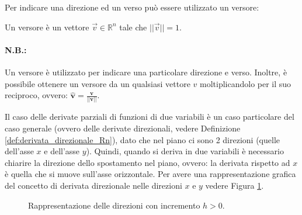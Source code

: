 Per indicare una direzione ed un verso può essere utilizzato un versore:
\begin{definition}[Versore]\label{def:versore}
    Un versore è un vettore $\overset{\rightarrow}{v}\in\mathbb R^n$ tale che $||\overset{\rightarrow}{v}||=1$.
\end{definition}

\paragraph{N.B.:} Un versore è utilizzato per indicare una particolare direzione e verso. Inoltre, è possibile ottenere un versore da un qualsiasi vettore $v$ moltiplicandolo per il suo reciproco, ovvero: $\hat {\mathbf{v}}=\frac{\mathbf{v}}{||\mathbf {v}||}.$

Il caso delle derivate parziali di funzioni di due variabili è un caso particolare del caso generale (ovvero delle derivate direzionali, vedere Definizione \ref{def:derivata_direzionale_Rn}), dato che nel piano ci sono 2 direzioni (quelle dell'asse $x$ e dell'asse $y$). Quindi, quando si deriva in due variabili è necessario chiarire la direzione dello spostamento nel piano, ovvero: la derivata rispetto ad $x$ è quella che si muove sull'asse orizzontale. Per avere una rappresentazione grafica del concetto di derivata direzionale nelle direzioni $x$ e $y$ vedere Figura \ref{fig:rappresentazione_direzione_R2}.


\begin{figure}[ht]
	\centering
	\caption{Rappresentazione delle direzioni con incremento $h>0$.}\label{fig:rappresentazione_direzione_R2}
\end{figure}

